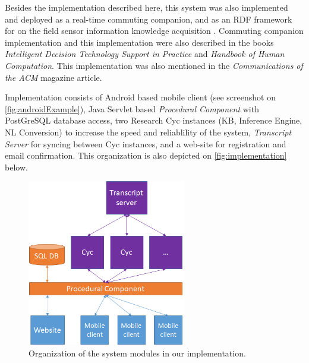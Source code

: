 Besides the implementation described here, this system was also implemented and
deployed as a real-time commuting companion\parencite{Figueiras2013}, and as an
RDF framework for on the field sensor information knowledge acquisition
\parencite{Bradesko2012a}. Commuting companion implementation and this 
implementation were also described in the books \emph{Intelligent Decision 
Technology Support in Practice}\parencite{Costa2016} and \emph{Handbook of Human 
Computation}\parencite{Witbrock2013}. This implementation was also mentioned
in the \emph{Communications of the ACM} magazine article\parencite{Geller2016}.

Implementation consists of Android based mobile client (see screenshot on
\autoref{fig:androidExample}), Java Servlet based
\emph{Procedural Component} with PostGreSQL database access, two Research 
Cyc instances 
(KB, Inference Engine, NL Conversion) to increase the speed and reliablility 
of the system, \emph{Transcript Server} for syncing between Cyc instances, 
and a web-site for registration and email confirmation. This organization is 
also depicted on \autoref{fig:implementation} below.

\begin{figure}[H]
	\centering
		\includegraphics[width=0.62\textwidth]{figures/implementationOrg.png}
	\caption{Organization of the system modules in our implementation.}
	\label{fig:implementation}
\end{figure}


